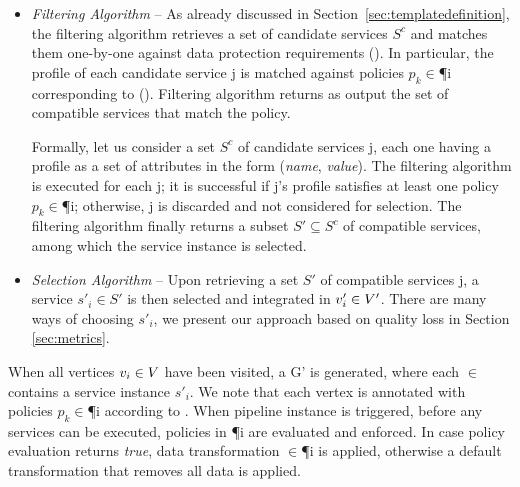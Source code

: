   \begin{itemize}

    \item \textit{Filtering Algorithm} -- As already discussed in Section~\ref{sec:templatedefinition}, the filtering algorithm retrieves a set of candidate services $S^c$ and matches them one-by-one against data protection requirements \myLambda(). In particular, the profile of each candidate service \si{j} is matched against policies $p_k$$\in$\P{i} corresponding to \myLambda(). Filtering algorithm returns as output the set of compatible services that match the policy.

    Formally, let us consider a set $S^c$ of candidate services \si{j}, each one having a profile as a set of attributes in the form (\emph{name}, \emph{value}). The filtering algorithm is executed for each \si{j}; it is successful if \si{j}'s profile satisfies at least one policy $p_k$$\in$\P{i}; otherwise, \si{j} is discarded and not considered for selection. The filtering algorithm finally returns a subset $S'\subseteq S^c$ of compatible services, among which the service instance is selected. 

    \item \textit{Selection Algorithm} -- Upon retrieving a set $S'$ of compatible services \si{j}, a service $s'_i$$\in$$S'$ is then selected and integrated in $v'_{i}\in V'$. There are many ways of choosing $s'_i$, we present our approach based on quality loss in Section \ref{sec:metrics}.
  \end{itemize}

  When all vertices $v_{i}\in V$ have been visited, a \pipelineInstance G' is generated, where each $\in$\Vp contains a service instance $s'_i$. We note that each vertex  is annotated with policies $p_k$$\in$\P{i} according to \myLambda. When pipeline instance is triggered, before any services can be executed, policies in \P{i} are evaluated and enforced. In case policy evaluation returns \emph{true}, data transformation \TP$\in$\P{i} is applied, otherwise a default transformation that removes all data is applied.

